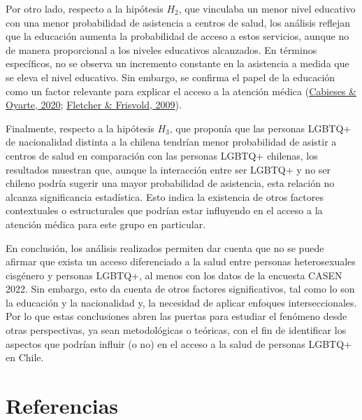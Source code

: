 \documentclass[
  12pt,
  a4paper,
]{article}
\begin{document}
Por otro lado, respecto a la hipótesis \(H_2\), que vinculaba un menor nivel educativo con una menor probabilidad de asistencia a centros de salud, los análisis reflejan que la educación aumenta la probabilidad de acceso a estos servicios, aunque no de manera proporcional a los niveles educativos alcanzados. En términos específicos, no se observa un incremento constante en la asistencia a medida que se eleva el nivel educativo. Sin embargo, se confirma el papel de la educación como un factor relevante para explicar el acceso a la atención médica (\protect\hyperlink{ref-cabieses2020health}{Cabieses \& Oyarte, 2020}; \protect\hyperlink{ref-fletcher2009higher}{Fletcher \& Frisvold, 2009}).

Finalmente, respecto a la hipótesis \(H_3\), que proponía que las personas LGBTQ+ de nacionalidad distinta a la chilena tendrían menor probabilidad de asistir a centros de salud en comparación con las personas LGBTQ+ chilenas, los resultados muestran que, aunque la interacción entre ser LGBTQ+ y no ser chileno podría sugerir una mayor probabilidad de asistencia, esta relación no alcanza significancia estadística. Esto indica la existencia de otros factores contextuales o estructurales que podrían estar influyendo en el acceso a la atención médica para este grupo en particular.

En conclusión, los análisis realizados permiten dar cuenta que no se puede afirmar que exista un acceso diferenciado a la salud entre personas heterosexuales cisgénero y personas LGBTQ+, al menos con los datos de la encuesta CASEN 2022. Sin embargo, esto da cuenta de otros factores significativos, tal como lo son la educación y la nacionalidad y, la necesidad de aplicar enfoques interseccionales. Por lo que estas conclusiones abren las puertas para estudiar el fenómeno desde otras perspectivas, ya sean metodológicas o teóricas, con el fin de identificar los aspectos que podrían influir (o no) en el acceso a la salud de personas LGBTQ+ en Chile.

\hypertarget{referencias}{%
\section{Referencias}\label{referencias}}
\end{document}
